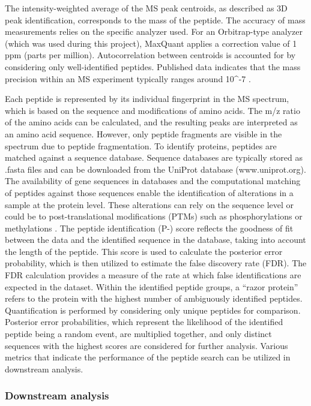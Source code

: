 \documentclass[
  11pt,
]{article}
\begin{document}
The intensity-weighted average of the MS peak centroids, as described as 3D peak identification, corresponds to the mass of the peptide. The accuracy of mass measurements relies on the specific analyzer used. For an Orbitrap-type analyzer (which was used during this project), MaxQuant applies a correction value of 1 ppm (parts per million). Autocorrelation between centroids is accounted for by considering only well-identified peptides. Published data indicates that the mass precision within an MS experiment typically ranges around 10\^{}-7 \citep{Wilschefski2019}.

Each peptide is represented by its individual fingerprint in the MS spectrum, which is based on the sequence and modifications of amino acids. The m/z ratio of the amino acids can be calculated, and the resulting peaks are interpreted as an amino acid sequence. However, only peptide fragments are visible in the spectrum due to peptide fragmentation. To identify proteins, peptides are matched against a sequence database. Sequence databases are typically stored as .fasta files and can be downloaded from the UniProt database (www.uniprot.org). The availability of gene sequences in databases and the computational matching of peptides against those sequences enable the identification of alterations in a sample at the protein level. These alterations can rely on the sequence level or could be to post-translational modifications (PTMs) such as phosphorylations or methylations \citep{Aebersold2003}. The peptide identification (P-) score reflects the goodness of fit between the data and the identified sequence in the database, taking into account the length of the peptide. This score is used to calculate the posterior error probability, which is then utilized to estimate the false discovery rate (FDR). The FDR calculation provides a measure of the rate at which false identifications are expected in the dataset. Within the identified peptide groups, a ``razor protein'' refers to the protein with the highest number of ambiguously identified peptides. Quantification is performed by considering only unique peptides for comparison. Posterior error probabilities, which represent the likelihood of the identified peptide being a random event, are multiplied together, and only distinct sequences with the highest scores are considered for further analysis. Various metrics that indicate the performance of the peptide search can be utilized in downstream analysis.

\hypertarget{downstream-analysis}{%
\subsubsection{Downstream analysis}\label{downstream-analysis}}
\end{document}
